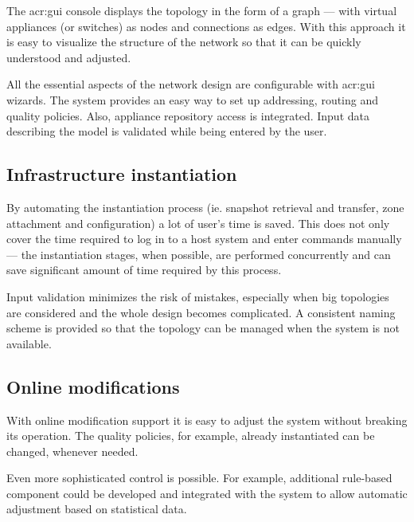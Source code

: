 \documentclass[11pt,openany]{book}
\begin{document}
        The \gls{acr:gui} console displays the topology in the form of a graph --- with virtual appliances (or switches) as nodes
        and connections as edges. With this approach it is easy to visualize the structure of the network so that it can
        be quickly understood and adjusted.

        All the essential aspects of the network design are configurable with \gls{acr:gui} wizards. The system provides an easy
        way to set up addressing, routing and quality policies. Also, appliance repository access is integrated. Input
        data describing the model is validated while being entered by the user. 


      \subsection{Infrastructure instantiation}
      \label{sub:uc:enhance:instantiation}

        By automating the instantiation process (ie. snapshot retrieval and transfer, zone attachment and configuration)
        a lot of user's time is saved. This does not only cover the time required to log in to a host system and enter
        commands manually --- the instantiation stages, when possible, are performed concurrently and can save
        significant amount of time required by this process.

        Input validation minimizes the risk of mistakes, especially when big topologies are considered and the whole
        design becomes complicated. A consistent naming scheme is provided so that the topology can be managed when the
        system is not available.



      \subsection{Online modifications}
      \label{sub:uc:enhance:online}

        With online modification support it is easy to adjust the system without breaking its operation. The quality
        policies, for example, already instantiated can be changed, whenever needed.

        Even more sophisticated control is possible. For example, additional rule-based component could be developed and
        integrated with the system to allow automatic adjustment based on statistical data.
\end{document}
